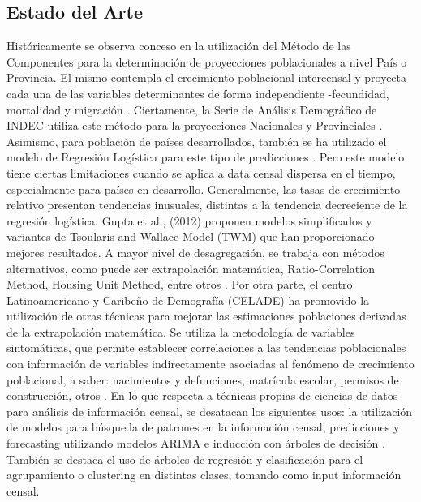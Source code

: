 \documentclass{article}
\theoremstyle{mytheoremstyle}
\theoremstyle{mytheoremstyle}
\theoremstyle{myproblemstyle}
\begin{document}
  \subsection{Estado del Arte}
Históricamente se observa conceso en la utilización del Método de las Componentes para la determinación de proyecciones
poblacionales a nivel País o Provincia. El mismo contempla el crecimiento poblacional intercensal y proyecta cada una
de las variables determinantes de forma independiente -fecundidad, mortalidad y migración .\newline\newline  
Ciertamente, la Serie de Análisis Demográfico de INDEC utiliza este método para la proyecciones Nacionales y Provinciales .
Asimismo, para población de países desarrollados, también se ha utilizado el modelo de Regresión Logística para este tipo de predicciones . Pero este modelo tiene ciertas limitaciones cuando se aplica a data censal dispersa en el tiempo, especialmente para países en desarrollo. Generalmente, las tasas de crecimiento relativo presentan tendencias inusuales, distintas a la tendencia decreciente de la regresión logística. Gupta et al., (2012) proponen modelos simplificados y variantes de Tsoularis and Wallace Model (TWM) que han proporcionado mejores resultados.
A mayor nivel de desagregación, se trabaja con métodos alternativos, como puede ser extrapolación matemática, 
Ratio-Correlation Method, Housing Unit Method, entre otros .\newline\newline
Por otra parte, el centro Latinoamericano y Caribeño de Demografía (CELADE) ha promovido la utilización 
de otras técnicas para mejorar las estimaciones poblaciones derivadas de la extrapolación matemática. 
Se utiliza la metodología de variables sintomáticas, que permite establecer correlaciones a las tendencias poblacionales
con información de variables indirectamente asociadas al fenómeno de crecimiento poblacional,
a saber: nacimientos y defunciones, matrícula escolar, permisos de construcción, otros .\newline\newline 
En lo que respecta a técnicas propias de ciencias de datos para análisis de información censal, 
se desatacan los siguientes usos: la utilización de modelos para búsqueda de patrones en la información censal,
predicciones y forecasting utilizando modelos ARIMA e inducción con árboles de decisión  . 
También se destaca el uso de árboles de regresión y clasificación para el agrupamiento o clustering en distintas clases,
tomando como input información censal.
\end{document}
